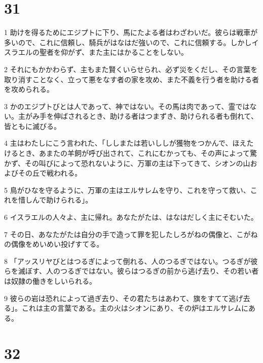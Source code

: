 \chapter{31}

\par 1 助けを得るためにエジプトに下り、馬にたよる者はわざわいだ。彼らは戦車が多いので、これに信頼し、騎兵がはなはだ強いので、これに信頼する。しかしイスラエルの聖者を仰がず、また主にはかることをしない。
\par 2 それにもかかわらず、主もまた賢くいらせられ、必ず災をくだし、その言葉を取り消すことなく、立って悪をなす者の家を攻め、また不義を行う者を助ける者を攻められる。
\par 3 かのエジプトびとは人であって、神ではない。その馬は肉であって、霊ではない。主がみ手を伸ばされるとき、助ける者はつまずき、助けられる者も倒れて、皆ともに滅びる。
\par 4 主はわたしにこう言われた、「ししまたは若いししが獲物をつかんで、ほえたけるとき、あまたの羊飼が呼び出されて、これにむかっても、その声によって驚かず、その叫びによって恐れないように、万軍の主は下ってきて、シオンの山およびその丘で戦われる。
\par 5 鳥がひなを守るように、万軍の主はエルサレムを守り、これを守って救い、これを惜しんで助けられる」。
\par 6 イスラエルの人々よ、主に帰れ。あなたがたは、はなはだしく主にそむいた。
\par 7 その日、あなたがたは自分の手で造って罪を犯したしろがねの偶像と、こがねの偶像をめいめい投げすてる。
\par 8 「アッスリヤびとはつるぎによって倒れる、人のつるぎではない。つるぎが彼らを滅ぼす、人のつるぎではない。彼らはつるぎの前から逃げ去り、その若い者は奴隷の働きをしいられる。
\par 9 彼らの岩は恐れによって過ぎ去り、その君たちはあわて、旗をすてて逃げ去る」。これは主の言葉である。主の火はシオンにあり、その炉はエルサレムにある。

\chapter{32}

